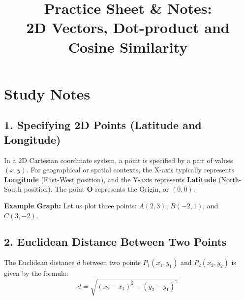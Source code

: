 \documentclass[11pt]{article}
\title{\textbf{Practice Sheet \& Notes:\\ 2D Vectors, Dot-product and Cosine Similarity}}
\author{}
\date{}
\begin{document}
\maketitle

\section*{Study Notes}

\subsection*{1. Specifying 2D Points (Latitude and Longitude)}
In a 2D Cartesian coordinate system, a point is specified by a pair of values $(x, y)$. For geographical or spatial contexts, the X-axis typically represents \textbf{Longitude} (East-West position), and the Y-axis represents \textbf{Latitude} (North-South position). The point $\mathbf{O}$ represents the Origin, or $(0,0)$.

\textbf{Example Graph:} Let us plot three points: $A(2, 3)$, $B(-2, 1)$, and $C(3, -2)$.

\begin{center}
\end{center}

\subsection*{2. Euclidean Distance Between Two Points}
The Euclidean distance $d$ between two points $P_1(x_1, y_1)$ and $P_2(x_2, y_2)$ is given by the formula:
\[ d = \sqrt{(x_2 - x_1)^2 + (y_2 - y_1)^2} \]
\end{document}

